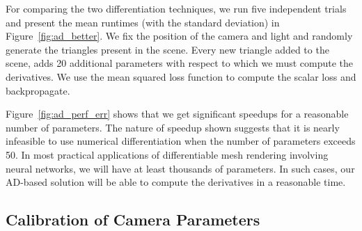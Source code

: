 \documentclass{juliacon}
\begin{document}
For comparing the two differentiation techniques, we run five independent trials and present the mean runtimes (with the standard deviation) in Figure~\ref{fig:ad_better}. We fix the position of the camera and light and randomly generate the triangles present in the scene. Every new triangle added to the scene, adds 20 additional parameters with respect to which we must compute the derivatives. We use the mean squared loss function to compute the scalar loss and backpropagate.

Figure~\ref{fig:ad_perf_err} shows that we get significant speedups for a reasonable number of parameters. The nature of speedup shown suggests that it is nearly infeasible to use numerical differentiation when the number of parameters exceeds 50. In most practical applications of differentiable mesh rendering involving neural networks, we will have at least thousands of parameters. In such cases, our AD-based solution will be able to compute the derivatives in a reasonable time.

\subsection{Calibration of Camera Parameters}
\label{sec:calcam}
\end{document}
